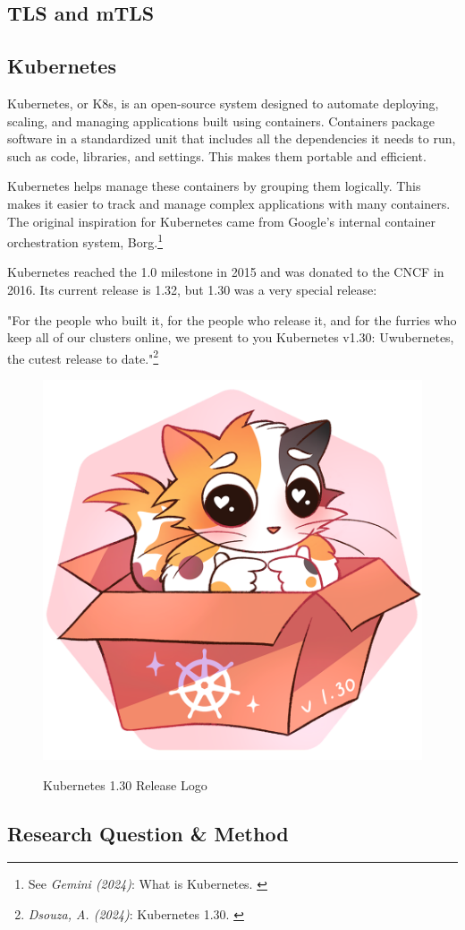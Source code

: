 \subsection{TLS and mTLS}



\subsection{Kubernetes}

Kubernetes, or K8s, is an open-source system designed to automate deploying, scaling, and managing applications built using containers. Containers package software in a standardized unit that includes all the dependencies it needs to run, such as code, libraries, and settings. This makes them portable and efficient.

Kubernetes helps manage these containers by grouping them logically. This makes it easier to track and manage complex applications with many containers. The original inspiration for Kubernetes came from Google's internal container orchestration system, Borg.\footnote{See \textit{Gemini (2024)}: What is Kubernetes. \cite{bardKubernetes}} 

Kubernetes reached the 1.0 milestone in 2015 and was donated to the CNCF in 2016. Its current release is 1.32, but 1.30 was a very special release:

"For the people who built it, for the people who release it, and for the furries who keep all of our clusters online, we present to you Kubernetes v1.30: Uwubernetes, the cutest release to date."\footnote{\textit{Dsouza, A. (2024)}: Kubernetes 1.30. \cite{uwubernetes}}

\begin{figure}[H]
\centering
\caption {Kubernetes 1.30 Release Logo}
\includegraphics[width=0.3\linewidth]{images/k8s-1.30.png}
\label{fig:uwubernetes}
\end{figure}

\subsection{Research Question \& Method}

